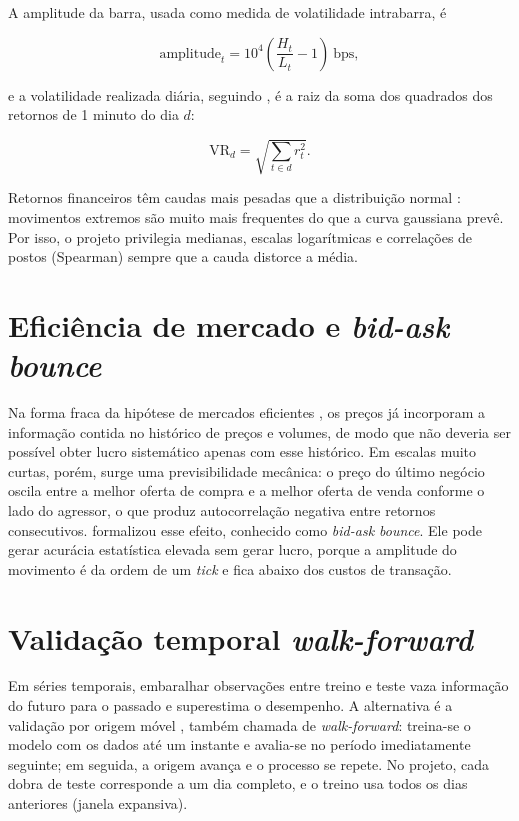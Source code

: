 A amplitude da barra, usada como medida de volatilidade intrabarra, é

\begin{equation}\label{eq:amplitude}
  \mathrm{amplitude}_t = 10^4\left(\frac{H_t}{L_t} - 1\right)\ \text{bps},
\end{equation}

\noindent e a volatilidade realizada diária, seguindo ,
é a raiz da soma dos quadrados dos retornos de 1 minuto do dia $d$:

\begin{equation}\label{eq:volrealizada}
  \mathrm{VR}_d = \sqrt{\sum_{t \in d} r_t^{2}}.
\end{equation}

Retornos financeiros têm caudas mais pesadas que a distribuição normal
\cite{cont2001}: movimentos extremos são muito mais frequentes do que a curva
gaussiana prevê. Por isso, o projeto privilegia medianas, escalas logarítmicas e
correlações de postos (Spearman) sempre que a cauda distorce a média.

\section{Eficiência de mercado e \textit{bid-ask bounce}}\label{sec:eficiencia}

Na forma fraca da hipótese de mercados eficientes \cite{fama1970}, os preços já
incorporam a informação contida no histórico de preços e volumes, de modo que
não deveria ser possível obter lucro sistemático apenas com esse histórico.
Em escalas muito curtas, porém, surge uma previsibilidade mecânica: o preço do
último negócio oscila entre a melhor oferta de compra e a melhor oferta de venda
conforme o lado do agressor, o que produz autocorrelação negativa entre retornos
consecutivos.  formalizou esse efeito, conhecido como
\textit{bid-ask bounce}. Ele pode gerar acurácia estatística elevada sem gerar
lucro, porque a amplitude do movimento é da ordem de um \textit{tick} e fica
abaixo dos custos de transação.

\section{Validação temporal \textit{walk-forward}}\label{sec:walkforward}

Em séries temporais, embaralhar observações entre treino e teste vaza
informação do futuro para o passado e superestima o desempenho. A alternativa é
a validação por origem móvel \cite{hyndman2021}, também chamada de
\textit{walk-forward}: treina-se o modelo com os dados até um instante e
avalia-se no período imediatamente seguinte; em seguida, a origem avança e o
processo se repete. No projeto, cada dobra de teste corresponde a um dia
completo, e o treino usa todos os dias anteriores (janela expansiva).

